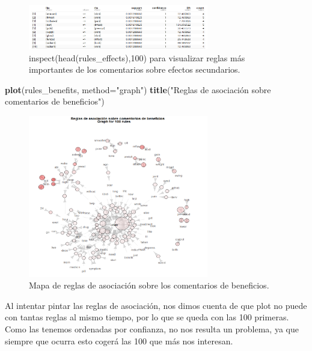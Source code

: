 \documentclass[spanish,]{article}
\newenvironment{Shaded}{\begin{snugshade}}{\end{snugshade}}
\newcommand{\KeywordTok}[1]{\textcolor[rgb]{0.13,0.29,0.53}{\textbf{#1}}}
\newcommand{\DataTypeTok}[1]{\textcolor[rgb]{0.13,0.29,0.53}{#1}}
\newcommand{\StringTok}[1]{\textcolor[rgb]{0.31,0.60,0.02}{#1}}
\newcommand{\NormalTok}[1]{#1}
\begin{document}
\begin{figure}[ht]
    \centering
    \includegraphics[width=0.7\textwidth]{figuras/asociacion/reglas_general_beneficios.png}
    \caption{inspect(head(rules\_effects),100) para visualizar reglas más importantes de los comentarios sobre efectos secundarios.}
    \label{fig:asociacion:reglasEffects}
\end{figure}

\begin{Shaded}
\begin{Highlighting}[]
\KeywordTok{plot}\NormalTok{(rules_benefits, }\DataTypeTok{method=}\StringTok{"graph"}\NormalTok{)}
\KeywordTok{title}\NormalTok{(}\StringTok{"Reglas de asociación sobre comentarios de beneficios"}\NormalTok{)}
\end{Highlighting}
\end{Shaded}

\begin{figure}[ht]
    \centering
    \includegraphics[width=0.7\textwidth]{figuras/asociacion/asociacion_beneficios.png}
    \caption{Mapa de reglas de asociación sobre los comentarios de beneficios.}
    \label{fig:asociacion:benefits}
\end{figure}

Al intentar pintar las reglas de asociación, nos dimos cuenta de que
plot no puede con tantas reglas al mismo tiempo, por lo que se queda con
las 100 primeras. Como las tenemos ordenadas por confianza, no nos
resulta un problema, ya que siempre que ocurra esto cogerá las 100 que
más nos interesan.
\end{document}

